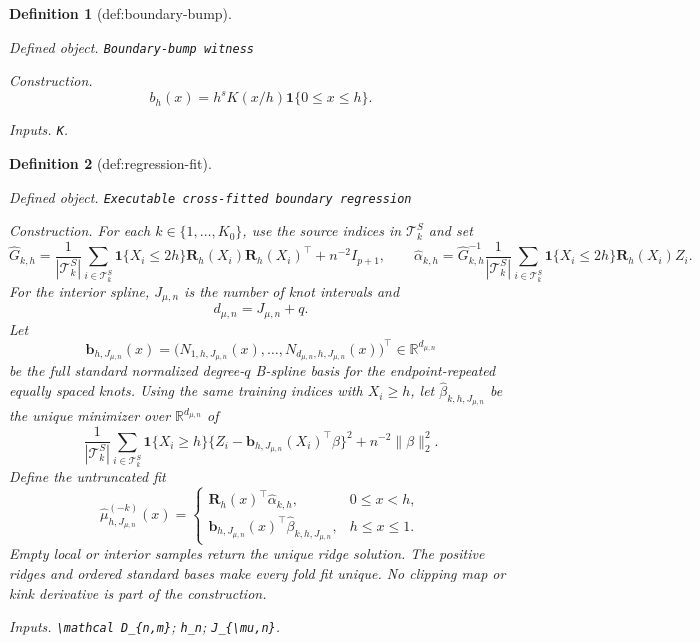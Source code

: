 \documentclass{article}
\newtheorem{definition}{Definition}
\begin{document}
\begin{definition}[def:boundary-bump]\label{def:boundary-bump}
\par\smallskip\noindent\emph{Defined object.} \texttt{Boundary-\allowbreak{}bump witness}
\par\smallskip\noindent\emph{Construction.} \[b_h(x)=h^sK(x/h)\mathbf 1\{0\le x\le h\}.\]
\par\smallskip\noindent\emph{Inputs.} \texttt{K}.
\end{definition}

\begin{definition}[def:regression-fit]\label{def:regression-fit}
\par\smallskip\noindent\emph{Defined object.} \texttt{Executable cross-\allowbreak{}fitted boundary regression}
\par\smallskip\noindent\emph{Construction.} For each \(k\in\{1,\ldots,K_0\}\), use the source indices in \(\mathcal T^S_k\) and set
\[
\widehat G_{k,h}=\frac1{|\mathcal T^S_k|}\sum_{i\in\mathcal T^S_k}\mathbf 1\{X_i\le2h\}\mathbf R_h(X_i)\mathbf R_h(X_i)^\top+n^{-2}I_{p+1},
\qquad
\widehat\alpha_{k,h}=\widehat G_{k,h}^{-1}\frac1{|\mathcal T^S_k|}\sum_{i\in\mathcal T^S_k}\mathbf 1\{X_i\le2h\}\mathbf R_h(X_i)Z_i.
\]
For the interior spline, \(J_{\mu,n}\) is the number of knot intervals and
\[
d_{\mu,n}=J_{\mu,n}+q.
\]
Let
\[
\mathbf b_{h,J_{\mu,n}}(x)
=\bigl(N_{1,h,J_{\mu,n}}(x),\ldots,N_{d_{\mu,n},h,J_{\mu,n}}(x)\bigr)^\top
\in\mathbb R^{d_{\mu,n}}
\]
be the full standard normalized degree-\(q\) B-spline basis for the endpoint-repeated equally spaced knots. Using the same training indices with \(X_i\ge h\), let \(\widehat\beta_{k,h,J_{\mu,n}}\) be the unique minimizer over \(\mathbb R^{d_{\mu,n}}\) of
\[
\frac1{|\mathcal T^S_k|}\sum_{i\in\mathcal T^S_k}\mathbf 1\{X_i\ge h\}
\{Z_i-\mathbf b_{h,J_{\mu,n}}(X_i)^\top\beta\}^2+n^{-2}\|\beta\|_2^2.
\]
Define the untruncated fit
\[
\widehat\mu^{(-k)}_{h,J_{\mu,n}}(x)=
\begin{cases}
\mathbf R_h(x)^\top\widehat\alpha_{k,h},&0\le x<h,\\
\mathbf b_{h,J_{\mu,n}}(x)^\top\widehat\beta_{k,h,J_{\mu,n}},&h\le x\le1.
\end{cases}
\]
Empty local or interior samples return the unique ridge solution. The positive ridges and ordered standard bases make every fold fit unique. No clipping map or kink derivative is part of the construction.
\par\smallskip\noindent\emph{Inputs.} \texttt{\textbackslash{}\allowbreak{}mathcal D\_\allowbreak{}\{n,\allowbreak{}m\}\allowbreak{}}; \texttt{h\_\allowbreak{}n}; \texttt{J\_\allowbreak{}\{\textbackslash{}\allowbreak{}mu,\allowbreak{}n\}\allowbreak{}}.
\end{definition}
\end{document}
